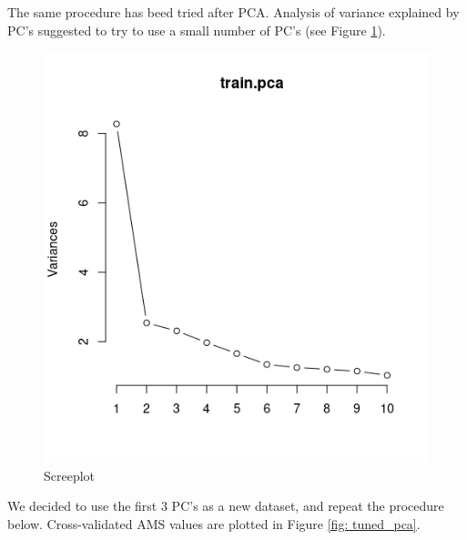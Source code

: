 \documentclass[]{article}
\begin{document}
The same procedure has beed tried after PCA. Analysis of variance explained by PC's suggested to try to use a small number of PC's (see Figure \ref{fig: screeplot}).
\begin{figure}[H]
\centering
\includegraphics[scale=0.7]{../Pictures/trainpcascreeplot.png} 
\caption{Screeplot}
\label{fig: screeplot}
\end{figure}

We decided to use the first $3$ PC's as a new dataset, and repeat the procedure below. Cross-validated AMS values are plotted in Figure \ref{fig: tuned_pca}.
\end{document}
